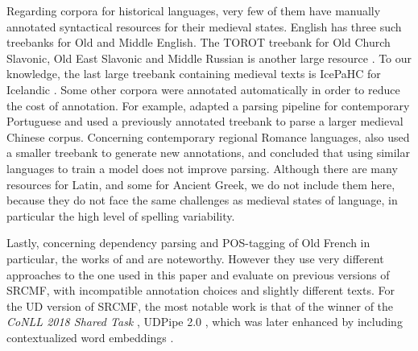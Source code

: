 

Regarding corpora for historical languages, very few of them have manually annotated syntactical resources for their medieval states. English has three such treebanks \citep{oxford-2001-the,kroch-etal-2000-the,traugott-pintzuk-2008-coding} for Old and Middle English. The TOROT treebank for Old Church Slavonic, Old East Slavonic and Middle Russian is another large resource \citep{berdicevskis-eckhoff-2020-diachronic}. To our knowledge, the last large treebank containing medieval texts is IcePaHC for Icelandic \citep{rognvaldsson-etal-2012-icelandic}. Some other corpora were annotated automatically in order to reduce the cost of annotation. For example, \citet{rocio-etal-2003-automated} adapted a parsing pipeline for contemporary Portuguese and \citet{lee-kong-2014-a} used a previously annotated treebank \citep{lee-kong-2012-dependency} to parse a larger medieval Chinese corpus. Concerning contemporary regional Romance languages, \citet{miletic-etal-2020-building} also used a smaller treebank to generate new annotations, and concluded that using similar languages to train a model does not improve parsing. Although there are many resources for Latin, and some for Ancient Greek, we do not include them here, because they do not face the same challenges as medieval states of language, in particular the high level of spelling variability.

Lastly, concerning dependency parsing and POS-tagging of Old French in particular, the works of \citet{guibon-etal-2014-parsing} and \citet{stein-2014-parsing, stein-2016-old} are noteworthy. However they use very different approaches to the one used in this paper and evaluate on previous versions of SRCMF, with incompatible annotation choices and slightly different texts. For the UD version of SRCMF, the most notable work is that of the winner of the \emph{CoNLL 2018 Shared Task} \citep{zeman-etal-2018-conll}, UDPipe 2.0 \citep{straka-2018-udpipe}, which was later enhanced by including contextualized word embeddings \citep{straka-strakova-2019-evaluating}.

